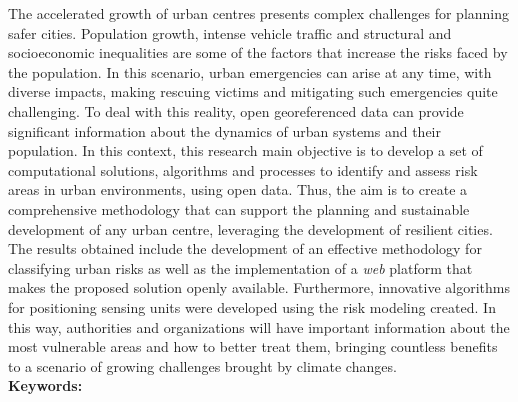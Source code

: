 \begin{thesisabastract}

The accelerated growth of urban centres presents complex challenges for planning safer cities. Population growth, intense vehicle traffic and structural and socioeconomic inequalities are some of the factors that increase the risks faced by the population. In this scenario, urban emergencies can arise at any time, with diverse impacts, making rescuing victims and mitigating such emergencies quite challenging. To deal with this reality, open georeferenced data can provide significant information about the dynamics of urban systems and their population. In this context, this research main objective is to develop a set of computational solutions, algorithms and processes to identify and assess risk areas in urban environments, using open data. Thus, the aim is to create a comprehensive methodology that can support the planning and sustainable development of any urban centre, leveraging the development of resilient cities. The results obtained include the development of an effective methodology for classifying urban risks as well as the implementation of a \textit{web} platform that makes the proposed solution openly available. Furthermore, innovative algorithms for positioning sensing units were developed using the risk modeling created. In this way, authorities and organizations will have important information about the most vulnerable areas and how to better treat them, bringing countless benefits to a scenario of growing challenges brought by climate changes.\\

\textbf{Keywords:} \ppgmkeywords

\end{thesisabastract}
